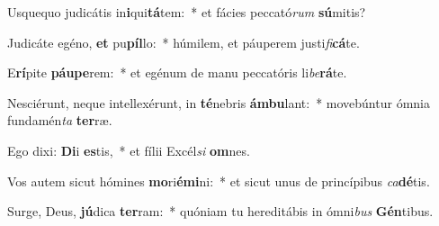 \item Usquequo judicátis in\textbf{i}qui\textbf{tá}tem:~* et fácies peccató\textit{rum} \textbf{sú}mitis?
\item Judicáte egéno, \textbf{et} pu\textbf{píl}lo:~* húmilem, et páuperem justi\textit{fi}\textbf{cá}te.
\item E\textbf{rí}pite \textbf{páu}\textbf{pe}rem:~* et egénum de manu peccatóris li\textit{be}\textbf{rá}te.
\item Nesciérunt, neque intellexérunt, in \textbf{té}nebris \textbf{ám}\textbf{bu}lant:~* movebúntur ómnia fundamén\textit{ta} \textbf{ter}ræ.
\item Ego dixi: \textbf{Di}i \textbf{es}tis,~* et fílii Excél\textit{si} \textbf{om}nes.
\item Vos autem sicut hómines \textbf{mo}ri\textbf{é}\textbf{mi}ni:~* et sicut unus de princípibus \textit{ca}\textbf{dé}tis.
\item Surge, Deus, \textbf{jú}dica \textbf{ter}ram:~* quóniam tu hereditábis in ómni\textit{bus} \textbf{Gén}tibus.
